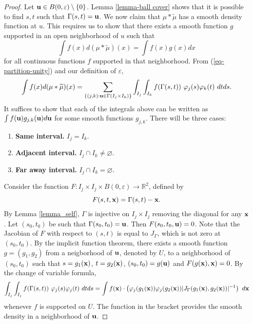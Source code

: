 \documentclass[10pt,a4paper]{amsart}
\newcommand{\RR}{{\mathbb R}}
\newcommand{\wt}[1]{\widetilde{#1}}
\begin{document}
\begin{proof}
Let  ${\bf u}\in B(0,\varepsilon)\setminus \{0\}$. Lemma \ref{lemma-ball cover} shows that it is possible to find $s,t$ such that $\Gamma (s,t) = {\bf u}$. We now claim that $\mu\ast\wt{\mu}$ has a smooth density function at $u$. This requires us to show that there exists a smooth function $g$ supported in an open neighborhood of $u$ such that 
$$
\int f(x) d(\mu\ast\wt\mu)(x) = \int f(x) g(x)dx
$$
for all continuous functions $f$ supported in that neighborhood.  From (\ref{eq-partition-unity}) and our definition of ${\varepsilon}$, 
\begin{equation}\label{eq-partition-unity1}
\int f(x)d(\mu\ast\wt{\mu})(x) = \sum_{\{(j,k): {\bf u}\in \Gamma(I_j\times I_k)\}}\int_{I_j}\int_{I_k} f(\Gamma(s,t))~\varphi_j(s)\varphi_k(t)~dtds.
\end{equation}
It suffices to show that each of the integrals above can be written as $
\int f({\bf u}) g_{{j,k}}({\bf u})d{\bf u}$ for some smooth functions $g_{{j,k}}$. There will be three cases:
\begin{enumerate}
    \item[Case 1:] {\bf  Same interval.} $I_j = I_k$.
    \item [Case 2:] {\bf  Adjacent interval.} $I_j \cap I_k\ne \varnothing$.
    \item[Case 3:]  {\bf Far away interval.} $I_j \cap I_k= \varnothing$.
\end{enumerate}

Consider the function {$F: I_j\times I_j\times B(0,\varepsilon)\to \RR^2$}, defined by 
\begin{equation}\label{eq_F}
F(s,t,{\bf x}) = \Gamma(s,t)- {\bf x}.
\end{equation}
By Lemma \ref{lemma_self}, $\Gamma$ is injective on $I_j\times I_j$ removing the diagonal {for any ${\bf x}$}. Let $(s_0,t_0)$ be such that $\Gamma(s_0,t_0) = {\bf u}$. Then $F(s_0,t_0,{\bf u}) =0$.  Note that the Jacobian of $F$ with respect to $(s,t)$ is equal to $J_{\Gamma}$, which is not zero at $(s_0,t_0).$ By the implicit function theorem, there exists a smooth function $g = (g_1,g_2)$ from a neigborhood of ${\bf u}$, denoted by $U$,  to a neighborhood of $(s_0,t_0)$ such that $s = g_1({\bf x})$, $t = g_2({\bf x})$, $(s_0,t_0) = g({\bf u})$ and $F(g({\bf x}),{\bf x}) = 0$. By the change of variable formula, 
\begin{equation}\label{eq-change-variable}
\int_{I_j}\int_{I_j} f(\Gamma(s,t))~\varphi_j(s)\varphi_j(t)~dtds= \int f({\bf x})\cdot \left(\varphi_j (g_1({\bf x}))\varphi_j (g_2({\bf x})) |J_{\Gamma}(g_1({\bf x}),g_2({\bf x}))|^{-1}\right) ~d{\bf x}
\end{equation}
whenever $f$ is supported on $U$. The function  in the bracket provides the smooth density in a neighborhood of ${\bf u}$. 



\end{proof}
\end{document}
